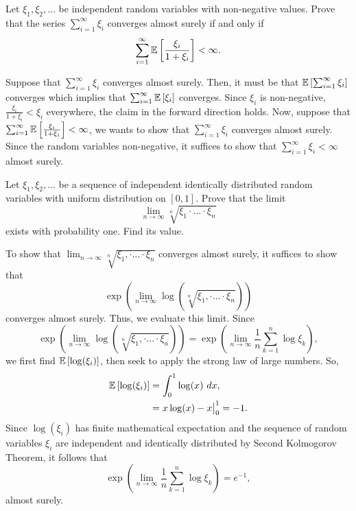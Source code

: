 \begin{problem}{6}
    Let $\xi_1,\xi_2,\ldots$ be independent random variables with non-negative values. Prove that the series $\sum_{i=1}^\infty \xi_i$ converges almost surely if and only if \[
    \sum_{i=1}^\infty \mathbb{E}\left[\frac{\xi_i}{1 + \xi_i}\right] < \infty.
    \]
\end{problem}
\begin{solution}
    Suppose that $\sum_{i=1}^\infty \xi_i$ converges almost surely. Then, it must be that $\mathbb{E}\left[\sum_{i=1}^\infty \xi_i\right]$ converges which implies that $\sum_{i=1}^\infty \mathbb{E}\left[\xi_i\right]$ converges. Since $\xi_i$ is non-negative, $\frac{\xi_i}{1+ \xi_i} < \xi_i$ everywhere, the claim in the forward direction holds. Now, suppose that $\sum_{i=1}^\infty \mathbb{E}\left[\frac{\xi_i}{1 + \xi_i}\right] < \infty$, we wants to show that $\sum_{i=1}^\infty \xi_i$ converges almost surely. Since the random variables non-negative, it suffices to show that $\sum_{i=1}^\infty \xi_i < \infty$ almost surely.
\end{solution}

\begin{problem}{7}
    Let $\xi_1,\xi_2,\ldots$ be a sequence of independent identically distributed random variables with uniform distribution on $[0,1]$. Prove that the limit \[
    \lim_{n\to\infty} \sqrt[n]{\xi_1\cdot \ldots \cdot \xi_n}
    \]
    exists with probability one. Find its value.
\end{problem}
\begin{solution}
To show that $\lim_{n\to\infty} \sqrt[n]{\xi_1,\cdot \ldots \cdot \xi_n}$ converges almost surely, it suffices to show that \[
\exp\left(\lim_{n\to\infty} \log\left(\sqrt[n]{\xi_1,\cdot \ldots \cdot \xi_n}\right)\right)
\] converges almost surely. Thus, we evaluate this limit. Since 
\[
\exp\left(\lim_{n\to\infty} \log\left(\sqrt[n]{\xi_1,\cdot \ldots \cdot \xi_n}\right)\right) = \exp\left(\lim_{n\to\infty} \frac{1}{n}\sum_{k=1}^n\log\xi_k\right),
\]
we first find $\mathbb{E}\left[\log(\xi_i)\right]$, then seek to apply the strong law of large numbers. So,
\begin{align*}
    \mathbb{E}\left[\log(\xi_i)\right] &= \int_0^1 \log(x)~dx, \\
    &= x\log(x) - x \big\vert_0^1 = -1. 
\end{align*}
Since $\log(\xi_i)$ has finite mathematical expectation and the sequence of random variables $\xi_i$ are independent and identically distributed by Second Kolmogorov Theorem, it follows that 
\[
\exp\left(\lim_{n\to\infty} \frac{1}{n}\sum_{k=1}^n\log\xi_k\right) = e^{-1},
\]
almost surely. 
\end{solution}

\begin{problem}{8}
\end{problem}
\begin{solution}
    
\end{solution}